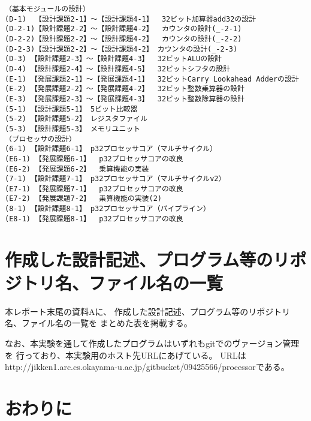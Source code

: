 \documentclass{jarticle}[11pt]
\begin{document}
\begin{verbatim}
（基本モジュールの設計）
(D-1)  【設計課題2-1】〜【設計課題4-1】	32ビット加算器add32の設計
(D-2-1)【設計課題2-2】〜【設計課題4-2】	カウンタの設計(_-2-1)
(D-2-2)【設計課題2-2】〜【設計課題4-2】	カウンタの設計(_-2-2)
(D-2-3)【設計課題2-2】〜【設計課題4-2】 カウンタの設計(_-2-3)
(D-3) 【設計課題2-3】〜【設計課題4-3】  32ビットALUの設計
(D-4) 【設計課題2-4】〜【設計課題4-5】  32ビットシフタの設計
(E-1) 【発展課題2-1】〜【発展課題4-1】  32ビットCarry Lookahead Adderの設計
(E-2) 【発展課題2-2】〜【発展課題4-2】  32ビット整数乗算器の設計
(E-3) 【発展課題2-3】〜【発展課題4-3】  32ビット整数除算器の設計
(5-1) 【設計課題5-1】 5ビット比較器
(5-2) 【設計課題5-2】 レジスタファイル
(5-3) 【設計課題5-3】 メモリユニット
（プロセッサの設計）
(6-1) 【設計課題6-1】 p32プロセッサコア（マルチサイクル）
(E6-1) 【発展課題6-1】  p32プロセッサコアの改良
(E6-2) 【発展課題6-2】  乗算機能の実装
(7-1) 【設計課題7-1】 p32プロセッサコア（マルチサイクルv2）
(E7-1) 【発展課題7-1】  p32プロセッサコアの改良
(E7-2) 【発展課題7-2】  乗算機能の実装(2)
(8-1) 【設計課題8-1】 p32プロセッサコア（パイプライン）
(E8-1) 【発展課題8-1】  p32プロセッサコアの改良
\end{verbatim}



\section{作成した設計記述、プログラム等のリポジトリ名、ファイル名の一覧}
\label{sec:作成した設計記述、プログラム等のリポジトリ名、ファイル名の一覧}


本レポート末尾の資料Aに、
作成した設計記述、プログラム等のリポジトリ名、ファイル名の一覧を
まとめた表を掲載する。

なお、本実験を通して作成したプログラムはいずれもgitでのヴァージョン管理を
行っており、本実験用のホスト先URLにあげている。
URLはhttp://jikken1.arc.cs.okayama-u.ac.jp/gitbucket/09425566/processorである。




\section{おわりに}
\label{sec:おわりに}
% 
\end{document}
